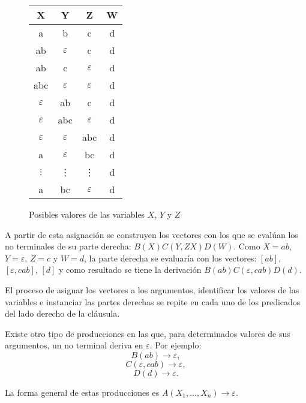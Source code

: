 \documentclass[12pt]{article}
\begin{document}
\begin{figure}
    \centering
    \begin{tabular}{|c|c|c|c|}
        \hline
        X             & Y             & Z             & W \\
        \hline
        a             & b             & c             & d \\
        \hline
        ab            & $\varepsilon$ & c             & d \\
        \hline
        ab            & c             & $\varepsilon$ & d \\
        \hline
        abc           & $\varepsilon$ & $\varepsilon$ & d \\
        \hline
        $\varepsilon$ & ab            & c             & d \\
        \hline
        $\varepsilon$ & abc           & $\varepsilon$ & d \\
        \hline
        $\varepsilon$ & $\varepsilon$ & abc           & d \\
        \hline
        a             & $\varepsilon$ & bc            & d \\
        \hline
        $\vdots$      & \vdots        & \vdots        & d \\
        \hline
        a             & bc            & $\varepsilon$ & d \\
        \hline
    \end{tabular}
    \caption{Posibles valores de las variables $X$, $Y$ y $Z$}
    \label{fig:xyz_eaxmple}
\end{figure}

A partir de esta  asignación se construyen los vectores con los que se evalúan los no terminales 
de su parte derecha: $B(X)C(Y,ZX)D(W)$. Como $X=ab$, $Y=\varepsilon$, $Z=c$ y $W=d$, la parte derecha se evaluaría con los vectores: $[ab]$, $[\varepsilon, cab]$, $[d]$ y como resultado se tiene la derivación $B(ab)C(\varepsilon,cab)D(d)$.

El proceso de asignar los vectores a los argumentos, identificar los valores de las variables e instanciar las partes derechas se repite en cada uno de los predicados del lado derecho de la cláusula.

Existe otro tipo de producciones en las que, para determinados valores de sus argumentos, un no terminal deriva en $\varepsilon$. Por ejemplo: 
$$B(ab)\to \varepsilon,$$
$$C(\varepsilon,cab)\to \varepsilon,$$
$$D(d)\to \varepsilon.$$

La forma general de estas producciones es $A(X_1,\ldots, X_n)\rightarrow \varepsilon$.
\end{document}
